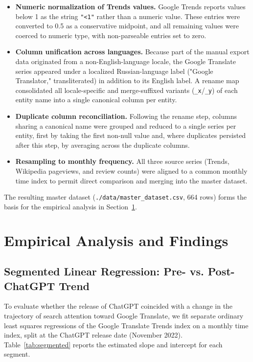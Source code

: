 \documentclass[11pt]{article}
\begin{document}
\begin{itemize}
    \item \textbf{Numeric normalization of Trends values.} Google Trends reports values below 1 as the string \texttt{"<1"} rather than a numeric value. These entries were converted to \num{0.5} as a conservative midpoint, and all remaining values were coerced to numeric type, with non-parseable entries set to zero.
    \item \textbf{Column unification across languages.} Because part of the manual export data originated from a non-English-language locale, the Google Translate series appeared under a localized Russian-language label ("Google Translator," transliterated) in addition to its English label. A rename map consolidated all locale-specific and merge-suffixed variants (\texttt{\_x}/\texttt{\_y}) of each entity name into a single canonical column per entity.
    \item \textbf{Duplicate column reconciliation.} Following the rename step, columns sharing a canonical name were grouped and reduced to a single series per entity, first by taking the first non-null value and, where duplicates persisted after this step, by averaging across the duplicate columns.
    \item \textbf{Resampling to monthly frequency.} All three source series (Trends, Wikipedia pageviews, and review counts) were aligned to a common monthly time index to permit direct comparison and merging into the master dataset.
\end{itemize}

The resulting master dataset (\texttt{./data/master\_dataset.csv}, 664 rows) forms the basis for the empirical analysis in Section~\ref{sec:findings}.

\section{Empirical Analysis and Findings}
\label{sec:findings}

\subsection{Segmented Linear Regression: Pre- vs. Post-ChatGPT Trend}

To evaluate whether the release of ChatGPT coincided with a change in the trajectory of search attention toward Google Translate, we fit separate ordinary least squares regressions of the Google Translate Trends index on a monthly time index, split at the ChatGPT release date (November 2022). Table~\ref{tab:segmented} reports the estimated slope and intercept for each segment.
\end{document}
